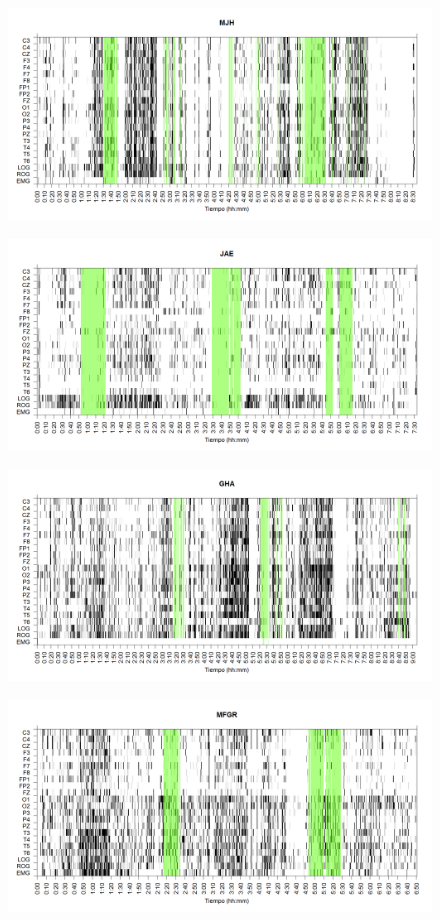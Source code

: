 \documentclass[12pt,a4paper]{mitthesis}
\begin{document}
\begin{figure}
\centering
\includegraphics[width=0.8\linewidth]
{./img_ejemplos/MJNNVIGILOS_est.png} 
\label{grf_MJH}
\end{figure}

\begin{figure}
\centering
\includegraphics[width=0.8\linewidth]
{./img_ejemplos/JANASUE_est.png} 
\label{grf_JAE}
\end{figure}

\begin{figure}
\centering
\includegraphics[width=0.8\linewidth]
{./img_ejemplos/GH24031950SUENNO_est.png} 
\label{grf_GHA}
\end{figure}

\begin{figure}
\centering
\includegraphics[width=0.8\linewidth]
{./img_ejemplos/GURM251148SUE_est.png} 
\label{grf_MFGR}
\end{figure}
\end{document}
